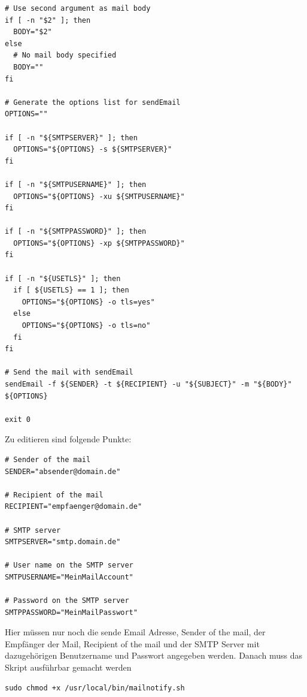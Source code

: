 \documentclass[11pt,a4paper]{article} %
\begin{document}
\begin{frame}
\begin{lstlisting}
# Use second argument as mail body
if [ -n "$2" ]; then
  BODY="$2"
else
  # No mail body specified
  BODY=""
fi

# Generate the options list for sendEmail
OPTIONS=""

if [ -n "${SMTPSERVER}" ]; then
  OPTIONS="${OPTIONS} -s ${SMTPSERVER}"
fi

if [ -n "${SMTPUSERNAME}" ]; then
  OPTIONS="${OPTIONS} -xu ${SMTPUSERNAME}"
fi

if [ -n "${SMTPPASSWORD}" ]; then
  OPTIONS="${OPTIONS} -xp ${SMTPPASSWORD}"
fi

if [ -n "${USETLS}" ]; then
  if [ ${USETLS} == 1 ]; then
    OPTIONS="${OPTIONS} -o tls=yes"
  else
    OPTIONS="${OPTIONS} -o tls=no"
  fi
fi

# Send the mail with sendEmail
sendEmail -f ${SENDER} -t ${RECIPIENT} -u "${SUBJECT}" -m "${BODY}" ${OPTIONS}

exit 0
\end{lstlisting}
\end{frame}

Zu editieren sind folgende Punkte:
\begin{frame}

\begin{lstlisting}
# Sender of the mail
SENDER="absender@domain.de"

# Recipient of the mail
RECIPIENT="empfaenger@domain.de"

# SMTP server
SMTPSERVER="smtp.domain.de"

# User name on the SMTP server
SMTPUSERNAME="MeinMailAccount"

# Password on the SMTP server
SMTPPASSWORD="MeinMailPasswort"
\end{lstlisting}
\end{frame}
Hier müssen nur noch die sende Email Adresse, Sender of the mail, der Empfänger der Mail, Recipient of the mail und der SMTP Server mit dazugehörigen Benutzername und Passwort angegeben werden.
Danach muss das Skript ausführbar gemacht werden
\begin{frame}

\begin{lstlisting}
sudo chmod +x /usr/local/bin/mailnotify.sh
\end{lstlisting}
\end{frame}
\end{document}
